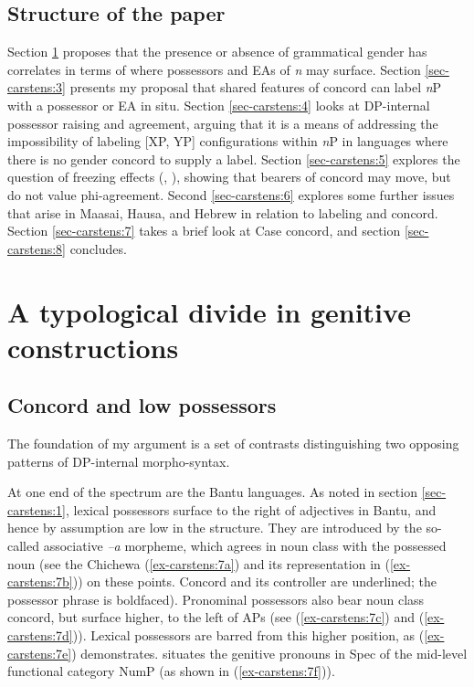 \documentclass[output=paper
,modfonts
,nonflat]{langsci/langscibook}
\begin{document}
\subsection{Structure of the paper} \label{sec-carstens:1.5}
Section \ref{sec-carstens:2} proposes that the presence or absence of grammatical gender has correlates in terms of where possessors and EAs of \textit{n} may surface. Section \ref{sec-carstens:3} presents my proposal that shared features of concord can label \textit{n}P with a possessor or EA in situ. Section \ref{sec-carstens:4} looks at DP-internal possessor raising and agreement, arguing that it is a means of addressing the impossibility of labeling [XP, YP] configurations within \textit{n}P in languages where there is no gender concord to supply a label. Section \ref{sec-carstens:5} explores the question of {\textquotedbl}freezing{\textquotedbl} effects (\citealt{Rizzi2006}, \citealt{Rizzi_Shlonsky2007}), showing that bearers of concord may move, but do not value phi-agreement. Second \ref{sec-carstens:6} explores some further issues that arise in Maasai, Hausa, and Hebrew in relation to labeling and concord. Section \ref{sec-carstens:7} takes a brief look at Case concord, and section \ref{sec-carstens:8} concludes.

\section{A typological divide in genitive constructions} \label{sec-carstens:2}
\subsection{Concord and low possessors} \label{sec-carstens:2.1}
The foundation of my argument is a set of contrasts distinguishing two opposing patterns of DP-internal morpho-syntax. 

At one end of the spectrum are the Bantu languages. As noted in section \ref{sec-carstens:1}, lexical possessors surface to the right of adjectives in Bantu, and hence by assumption are low in the structure. They are introduced by the so-called associative \textit{–a} morpheme, which agrees in noun class with the possessed noun (see the Chichewa (\ref{ex-carstens:7a}) and its representation in (\ref{ex-carstens:7b})) on these points. Concord and its controller are underlined; the possessor phrase is boldfaced). Pronominal possessors also bear noun class concord, but surface higher, to the left of APs (see (\ref{ex-carstens:7c}) and (\ref{ex-carstens:7d})). Lexical possessors are barred from this higher position, as (\ref{ex-carstens:7e}) demonstrates. \citet{Carstens1991, Carstens1997} situates the genitive pronouns in Spec of the mid-level functional category NumP (as shown in (\ref{ex-carstens:7f})).
\end{document}
